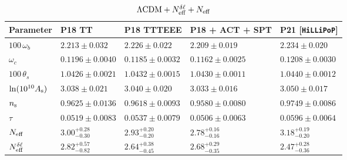 \begin{subappendices}
\begin{table}
\begin{subtable}{\textwidth}
		
		\begin{tabular}{l l l l l}
				\toprule
			Parameter			& P18 TT					& P18 TTTEEE				& P18 + ACT + SPT			& P21 [\texttt{HiLLiPoP}]	\\
				\midrule[0.065em]
			$100\,\omega_b$		& $2.213 \pm 0.032$			& $2.226 \pm 0.022$			& $2.209 \pm 0.019$			& $2.234 \pm 0.020$			\\
			$\omega_c$			& $0.1196 \pm 0.0040$		& $0.1185 \pm 0.0032$		& $0.1162 \pm 0.0025$		& $0.1208 \pm 0.0030$		\\
			$100\,\theta_s$		& $1.0426 \pm 0.0021$		& $1.0432 \pm 0.0015$		& $1.0430 \pm 0.0011$		& $1.0440 \pm 0.0012$		\\
			$\ln(10^{10}A_\mathrm{s})$	& $3.038 \pm 0.021$			& $3.040 \pm 0.020$			& $3.033 \pm 0.016$			& $3.050 \pm 0.017$			\\
			$n_\mathrm{s}$				& $0.9625 \pm 0.0136$		& $0.9618 \pm 0.0093$		& $0.9580 \pm 0.0080$		& $0.9749 \pm 0.0086$		\\
			$\tau$				& $0.0519 \pm 0.0083$		& $0.0537 \pm 0.0079$		& $0.0506 \pm 0.0063$		& $0.0596 \pm 0.0064$		\\
			$N_\mathrm{eff}$				& $3.00^{+0.28}_{-0.30}$	& $2.93^{+0.20}_{-0.20}$	& $2.78^{+0.16}_{-0.16}$	& $3.18^{+0.19}_{-0.20}$	\\
			$N_\mathrm{eff}^{\delta\ell}$		& $2.82^{+0.57}_{-0.82}$	& $2.64^{+0.38}_{-0.45}$	& $2.68^{+0.29}_{-0.35}$	& $2.47^{+0.28}_{-0.36}$	\\
				\bottomrule
		\end{tabular}
	
		\caption{$\Lambda\mathrm{CDM} + N_\mathrm{eff}^{\delta\ell} + N_\mathrm{eff}$}
\end{subtable}\\[4pt]
	\begin{subtable}{\textwidth}
		\centering


\end{subtable}
\end{table}
\end{subappendices}

